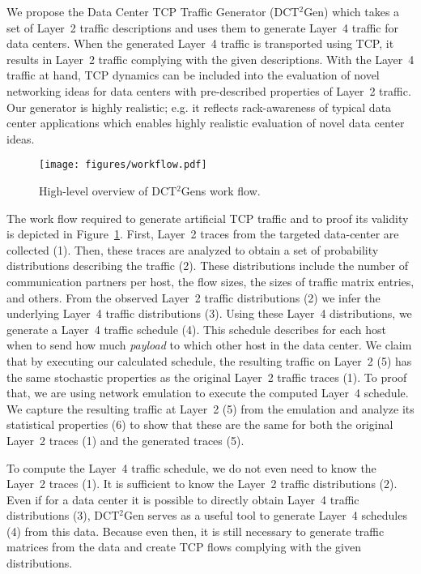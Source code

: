 \documentclass[journal,10pt]{IEEEtran}
\newcommand{\genname}{DCT${^2}$Gen}
\newcommand{\lf}{Layer~4}
\begin{document}
We propose 
the Data Center TCP Traffic Generator (\genname{})
which takes a set of Layer~2 traffic descriptions and uses them to generate Layer~4 traffic for data centers.
When the generated Layer~4 traffic is transported using TCP, it results in Layer~2 traffic complying with the given descriptions.
With the Layer~4 traffic at hand, TCP dynamics can be included into the evaluation of novel networking ideas for data centers
with pre-described properties of Layer~2 traffic.
Our generator is highly realistic; e.g. it reflects rack-awareness of typical data center applications
which enables highly realistic evaluation of novel data center ideas.


\begin{figure}
	\centering
	\texttt{[image: figures/workflow.pdf]}
	\caption{High-level overview of \genname{}s work flow.}
	\label{fig:workflow}
\end{figure}


The work flow required to generate artificial TCP traffic and to proof its validity is depicted in Figure~\ref{fig:workflow}.
First, Layer~2 traces from the targeted data-center are collected (1).
Then, these traces are analyzed to
obtain a set of probability distributions describing the traffic (2).
These distributions include the number of communication partners per host, the flow sizes, 
the sizes of traffic matrix entries, and others.
From the observed Layer~2 traffic distributions (2) we infer the underlying Layer~4 traffic distributions (3).
Using these \lf{} distributions, 
we generate a Layer~4 traffic schedule (4). 
This schedule describes for each host when to send how much \emph{payload} to which other host in the data center.
We claim that by executing our calculated schedule, the resulting traffic on Layer~2 (5) has the same stochastic properties as 
the original Layer~2 traffic traces (1).
To proof that, we are using network emulation to execute the computed \lf{} schedule. We capture the resulting traffic at Layer~2 (5) from the emulation and
analyze its statistical properties (6) to show that these are the same for both the original Layer~2 traces (1) and the generated traces (5).

To compute the Layer~4 traffic schedule, we do not even need to know the Layer~2 traces (1). 
It is sufficient to know the Layer~2 traffic distributions (2).
Even if for a data center it is possible to directly obtain \lf{} traffic distributions (3), \genname{} serves as a useful tool to generate
\lf{} schedules (4) from this data. Because even then, it is still necessary to generate traffic matrices from the data and create TCP flows complying with the
given distributions.
\end{document}
